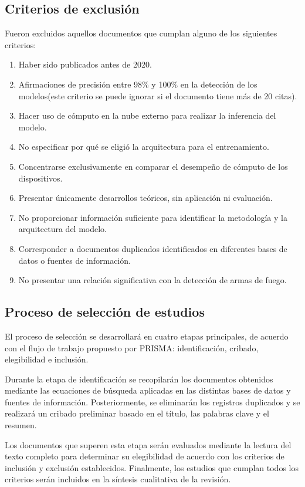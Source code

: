 \documentclass[stu,12pt,floatsintext]{apa7}
\begin{document}
\subsection{Criterios de exclusión}

Fueron excluidos aquellos documentos que cumplan alguno de los siguientes criterios:

\begin{enumerate}
\item Haber sido publicados antes de 2020.
\item Afirmaciones de precisión entre 98\% y 100\% en la detección de los modelos(este criterio se puede ignorar si el documento tiene más de 20 citas). 
\item Hacer uso de cómputo en la nube externo para realizar la inferencia del modelo.
\item No especificar por qué se eligió la arquitectura para el entrenamiento.
\item Concentrarse exclusivamente en comparar el desempeño de cómputo de los dispositivos.
\item Presentar únicamente desarrollos teóricos, sin aplicación ni evaluación.
\item No proporcionar información suficiente para identificar la metodología y la arquitectura del modelo.
\item Corresponder a documentos duplicados identificados en diferentes bases de datos o fuentes de información.
\item No presentar una relación significativa con la detección de armas de fuego.
\end{enumerate}

\subsection{Proceso de selección de estudios}

El proceso de selección se desarrollará en cuatro etapas principales, de acuerdo con el flujo de trabajo propuesto por PRISMA: identificación, cribado, elegibilidad e inclusión.

Durante la etapa de identificación se recopilarán los documentos obtenidos mediante las ecuaciones de búsqueda aplicadas en las distintas bases de datos y fuentes de información. Posteriormente, se eliminarán los registros duplicados y se realizará un cribado preliminar basado en el título, las palabras clave y el resumen.

Los documentos que superen esta etapa serán evaluados mediante la lectura del texto completo para determinar su elegibilidad de acuerdo con los criterios de inclusión y exclusión establecidos. Finalmente, los estudios que cumplan todos los criterios serán incluidos en la síntesis cualitativa de la revisión.
\end{document}
